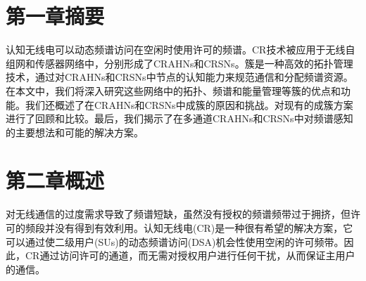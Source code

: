 \documentclass[a4paper,AutoFakeBold,oneside,12pt]{book}
\begin{document}
\begin{center}
 \end{center}
\vspace{8mm}
\thispagestyle{empty}

\begin{center}
\sihao{}

\xiaosihao{}

\xiaosihao{}
\end{center}

\songti{}
 \let\clearpage\relax

\chapter*{第一章\quad{}摘要}
\newtranschapter

  认知无线电可以动态频谱访问在空闲时使用许可的频谱。CR技术被应用于无线自组网和传感器网络中，分别形成了CRAHNs和CRSNs。簇是一种高效的拓扑管理技术，通过对CRAHNs和CRSNs中节点的认知能力来规范通信和分配频谱资源。在本文中，我们将深入研究这些网络中的拓扑、频谱和能量管理等簇的优点和功能。我们还概述了在CRAHNs和CRSNs中成簇的原因和挑战。对现有的成簇方案进行了回顾和比较。最后，我们揭示了在多通道CRAHNs和CRSNs中对频谱感知的主要想法和可能的解决方案。

\chapter*{第二章\quad{}概述}
\newtranschapter

  对无线通信的过度需求导致了频谱短缺，虽然没有授权的频谱频带过于拥挤，但许可的频段并没有得到有效利用。认知无线电(CR)是一种很有希望的解决方案，它可以通过使二级用户(SUs)的动态频谱访问(DSA)机会性使用空闲的许可频带。因此，CR通过访问许可的通道，而无需对授权用户进行任何干扰，从而保证主用户的通信。
  
\end{document}
